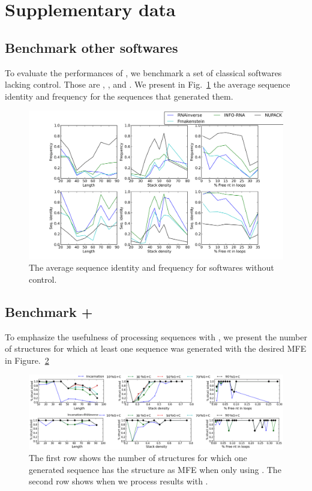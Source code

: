 \section{Supplementary data}

\subsection{Benchmark other softwares}
To evaluate the performances of \ourprog, we benchmark a set of classical softwares lacking \GCContent control. Those are \RNAinverse, \INFORNA, \NUPACK and \frankenstein. We present in Fig.~\ref{fig:no_gc_control} the average sequence identity and frequency
for the sequences that generated them.

\begin{figure}[ht!]
  \centering
  \includegraphics[width=\textwidth]{Figures/entropy_nogc.pdf}
  \caption{The average sequence identity and frequency for softwares without \GCContent control.}
  \label{fig:no_gc_control}
\end{figure}

\subsection{Benchmark \ourprog+\RNAinverse}
To emphasize the usefulness of processing \ourprog sequences with \RNAinverse, we present the number
of structures for which at least one sequence was generated with the desired MFE in Figure.~\ref{fig:nb_sols}

\begin{figure}[ht!]
  \centering
  \includegraphics[width=\textwidth]{Figures/struct_solved_vsrnainverse.pdf}
  \caption{The first row shows the number of structures for which one generated sequence has the 
  structure as MFE when only using \ourprog. The second row shows when we process \ourprog results with \RNAinverse.}
  \label{fig:nb_sols}
\end{figure}


